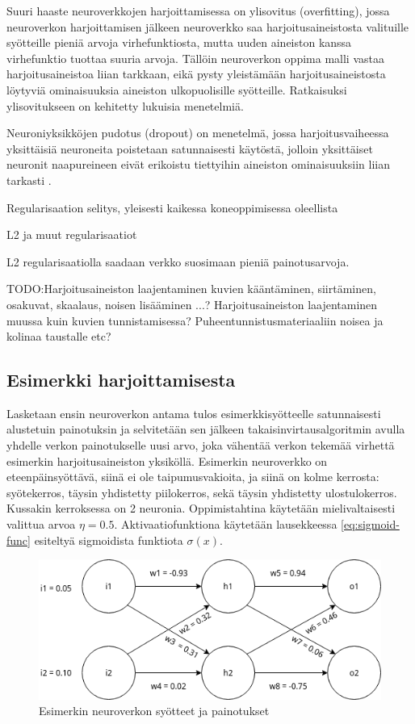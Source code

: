 \documentclass[finnish]{tktltiki2}
\theoremstyle{definition}
\theoremstyle{remark}
\begin{document}
  Suuri haaste neuroverkkojen harjoittamisessa on ylisovitus (overfitting), jossa neuroverkon harjoittamisen jälkeen neuroverkko saa harjoitusaineistosta valituille syötteille pieniä arvoja virhefunktiosta, mutta uuden aineiston kanssa virhefunktio tuottaa suuria arvoja. Tällöin neuroverkon oppima malli vastaa harjoitusaineistoa liian tarkkaan, eikä pysty yleistämään harjoitusaineistosta löytyviä ominaisuuksia aineiston ulkopuolisille syötteille. Ratkaisuksi ylisovitukseen on kehitetty lukuisia menetelmiä. 
  
  Neuroniyksikköjen pudotus (dropout) on menetelmä, jossa harjoitusvaiheessa yksittäisiä neuroneita poistetaan satunnaisesti käytöstä, jolloin yksittäiset neuronit naapureineen eivät erikoistu tiettyihin aineiston ominaisuuksiin liian tarkasti \cite{dropout-srivastava}.

  Regularisaation selitys, yleisesti kaikessa koneoppimisessa oleellista
  
  L2 ja muut regularisaatiot

  L2 regularisaatiolla saadaan verkko suosimaan pieniä painotusarvoja.

  TODO:Harjoitusaineiston laajentaminen kuvien kääntäminen, siirtäminen, osakuvat, skaalaus, noisen lisääminen ...?
  Harjoitusaineiston laajentaminen muussa kuin kuvien tunnistamisessa? Puheentunnistusmateriaaliin noisea ja kolinaa taustalle etc?

  \subsection{Esimerkki harjoittamisesta}

  Lasketaan ensin neuroverkon antama tulos esimerkkisyötteelle satunnaisesti alustetuin painotuksin ja selvitetään sen jälkeen takaisinvirtausalgoritmin avulla yhdelle verkon painotukselle uusi arvo, joka vähentää verkon tekemää virhettä esimerkin harjoitusaineiston yksiköllä. Esimerkin neuroverkko on eteenpäinsyöttävä, siinä ei ole taipumusvakioita, ja siinä on kolme kerrosta: syötekerros, täysin yhdistetty piilokerros, sekä täysin yhdistetty ulostulokerros. Kussakin kerroksessa on 2 neuronia. Oppimistahtina käytetään mielivaltaisesti valittua arvoa $\eta = 0.5$.
   Aktivaatiofunktiona käytetään lausekkeessa \ref{eq:sigmoid-func} esiteltyä sigmoidista funktiota $\sigma (x)$.

    \begin{figure}[h]
    \centering
    \includegraphics[scale=0.6]{draw-io-backprop-example}
    \caption{Esimerkin neuroverkon syötteet ja painotukset}
    \label{pic:backprop-example}
    \end{figure}
\end{document}
